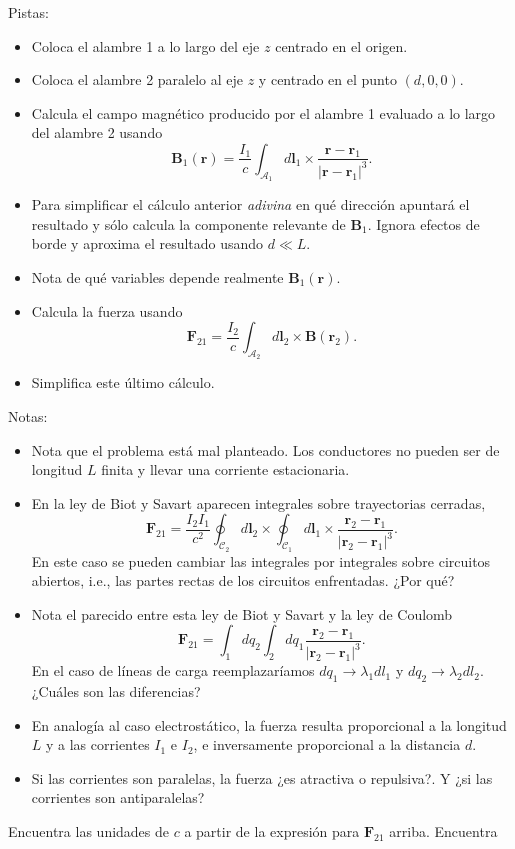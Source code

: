 \documentclass{exam}
\begin{document}
\begin{questions}
    Pistas:
    \begin{itemize}
    \item Coloca el alambre 1 a lo largo del eje $z$ centrado en el origen.
    \item Coloca el alambre 2 paralelo al eje $z$ y centrado en el
      punto $(d,0,0)$.
    \item Calcula el campo magnético producido por el alambre 1
      evaluado a lo largo del alambre 2 usando
      $$\bm B_1(\bm
      r)=\frac{I_1}{c}\int_{\mathcal A_1} d\bm l_1\times \frac{\bm r-\bm r_1}{|\bm
        r-\bm r_1|^3}.$$
    \item Para simplificar el cálculo anterior {\em adivina} en qué
      dirección apuntará el resultado y sólo calcula la componente
      relevante de $\bm B_1$. Ignora efectos de borde y aproxima el
      resultado usando $d\ll L$.
    \item Nota de qué variables depende realmente $\bm B_1(\bm r)$.
    \item Calcula la fuerza usando
      $$\bm F_{21}=\frac{I_2}{c}\int_{\mathcal A_2} d\bm l_2\times \bm B(\bm r_2).$$
    \item Simplifica este último cálculo.
    \end{itemize}
    Notas:
    \begin{itemize}
    \item Nota que el problema está mal planteado. Los conductores no
      pueden ser de longitud $L$ finita y llevar una corriente
      estacionaria.
    \item En la ley de Biot y Savart aparecen integrales sobre
      trayectorias cerradas,
      $$
      \bm F_{21}=\frac{I_2I_1}{c^2}\oint_{\mathcal
        C_2}d\bm l_2\times\oint_{\mathcal C_1}d\bm l_1\times \frac{\bm r_2-\bm r_1}{|\bm
        r_2-\bm r_1|^3}.
      $$
      En este caso se pueden cambiar las integrales por integrales
      sobre circuitos abiertos, i.e., las partes rectas de los
      circuitos enfrentadas. ¿Por qué?
    \item Nota el parecido entre esta ley de Biot y Savart y la ley de
      Coulomb
      $$
      \bm F_{21}=\int_1 dq_2 \int_2 dq_1 \frac{\bm r_2-\bm r_1}{|\bm r_2-\bm r_1|^3}.
      $$
      En el caso de líneas de carga reemplazaríamos
      $dq_1\to\lambda_1dl_1$ y $dq_2\to\lambda_2dl_2$.
      ¿Cuáles son las diferencias?
    \item En analogía al caso electrostático, la fuerza resulta
      proporcional a la longitud $L$ y a las corrientes $I_1$ e $I_2$,
      e inversamente proporcional a la distancia $d$.
    \item Si las corrientes son paralelas, la fuerza ¿es atractiva o
      repulsiva?. Y ¿si las corrientes son antiparalelas?
    \end{itemize}
  \question Encuentra las unidades de $c$ a partir de la expresión para
    $\bm F_{21}$ arriba.
  \question Encuentra
    \begin{parts}

\end{parts}
\end{questions}
\end{document}

